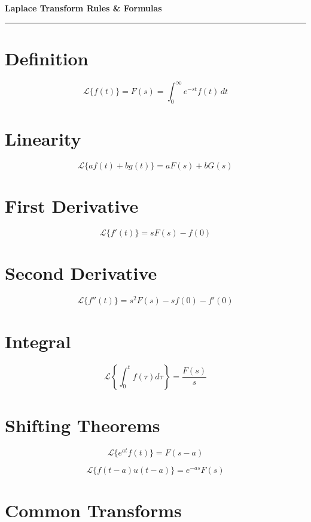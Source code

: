 \documentclass[fleqn]{article}
\begin{document}
\begin{center}
  {\LARGE \textbf{Laplace Transform Rules \& Formulas}}\\[6pt]
  \rule{\linewidth}{0.5pt}
\end{center}

\begin{multicols}{2}
\small

\section*{Definition}

\[
\mathcal{L}\{f(t)\} = F(s) = \int_0^\infty e^{-st} f(t) \, dt
\]

\section*{Linearity}

\[
\mathcal{L}\{a f(t) + b g(t)\} = a F(s) + b G(s)
\]

\section*{First Derivative}

\[
\mathcal{L}\{f'(t)\} = s F(s) - f(0)
\]

\section*{Second Derivative}

\[
\mathcal{L}\{f''(t)\} = s^2 F(s) - s f(0) - f'(0)
\]

\section*{Integral}

\[
\mathcal{L}\left\{\int_0^t f(\tau) d\tau\right\} = \frac{F(s)}{s}
\]

\section*{Shifting Theorems}

\[
\mathcal{L}\{e^{at} f(t)\} = F(s - a)
\]

\[
\mathcal{L}\{f(t - a) u(t - a)\} = e^{-as} F(s)
\]

\section*{Common Transforms}


\end{multicols}
\end{document}
